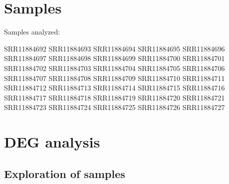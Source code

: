 \documentclass[
]{book}
\newenvironment{Shaded}{\begin{snugshade}}{\end{snugshade}}
\newcommand{\AttributeTok}[1]{\textcolor[rgb]{0.77,0.63,0.00}{#1}}
\newcommand{\CommentTok}[1]{\textcolor[rgb]{0.56,0.35,0.01}{\textit{#1}}}
\newcommand{\ControlFlowTok}[1]{\textcolor[rgb]{0.13,0.29,0.53}{\textbf{#1}}}
\newcommand{\DataTypeTok}[1]{\textcolor[rgb]{0.13,0.29,0.53}{#1}}
\newcommand{\ExtensionTok}[1]{#1}
\newcommand{\NormalTok}[1]{#1}
\newcommand{\OperatorTok}[1]{\textcolor[rgb]{0.81,0.36,0.00}{\textbf{#1}}}
\newcommand{\VariableTok}[1]{\textcolor[rgb]{0.00,0.00,0.00}{#1}}
\begin{document}
\begin{Shaded}
\end{Shaded}

\hypertarget{samples}{%
\section{Samples}\label{samples}}

Samples analyzed:

SRR11884692
SRR11884693
SRR11884694
SRR11884695
SRR11884696
SRR11884697
SRR11884698
SRR11884699
SRR11884700
SRR11884701
SRR11884702
SRR11884703
SRR11884704
SRR11884705
SRR11884706
SRR11884707
SRR11884708
SRR11884709
SRR11884710
SRR11884711
SRR11884712
SRR11884713
SRR11884714
SRR11884715
SRR11884716
SRR11884717
SRR11884718
SRR11884719
SRR11884720
SRR11884721
SRR11884723
SRR11884724
SRR11884725
SRR11884726
SRR11884727

\hypertarget{deg-analysis-1}{%
\section{DEG analysis}\label{deg-analysis-1}}

\hypertarget{exploration-of-samples}{%
\subsection{Exploration of samples}\label{exploration-of-samples}}

  
\end{document}
